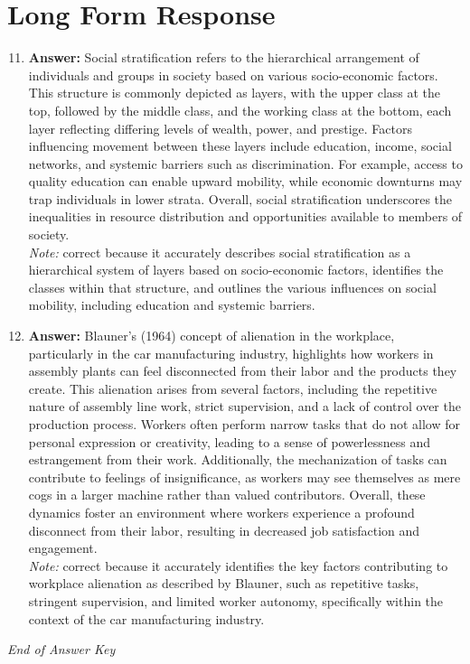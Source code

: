 \documentclass[12pt]{article}
\begin{document}
\section*{Long Form Response}
\begin{enumerate}[label=\arabic*.]
\setcounter{enumi}{10}
\item \textbf{Answer:} Social stratification refers to the hierarchical arrangement of individuals and groups in society based on various socio-economic factors. This structure is commonly depicted as layers, with the upper class at the top, followed by the middle class, and the working class at the bottom, each layer reflecting differing levels of wealth, power, and prestige. Factors influencing movement between these layers include education, income, social networks, and systemic barriers such as discrimination. For example, access to quality education can enable upward mobility, while economic downturns may trap individuals in lower strata. Overall, social stratification underscores the inequalities in resource distribution and opportunities available to members of society.
\\ \textit{Note:} correct because it accurately describes social stratification as a hierarchical system of layers based on socio-economic factors, identifies the classes within that structure, and outlines the various influences on social mobility, including education and systemic barriers.
\item \textbf{Answer:} Blauner's (1964) concept of alienation in the workplace, particularly in the car manufacturing industry, highlights how workers in assembly plants can feel disconnected from their labor and the products they create. This alienation arises from several factors, including the repetitive nature of assembly line work, strict supervision, and a lack of control over the production process. Workers often perform narrow tasks that do not allow for personal expression or creativity, leading to a sense of powerlessness and estrangement from their work. Additionally, the mechanization of tasks can contribute to feelings of insignificance, as workers may see themselves as mere cogs in a larger machine rather than valued contributors. Overall, these dynamics foster an environment where workers experience a profound disconnect from their labor, resulting in decreased job satisfaction and engagement.
\\ \textit{Note:} correct because it accurately identifies the key factors contributing to workplace alienation as described by Blauner, such as repetitive tasks, stringent supervision, and limited worker autonomy, specifically within the context of the car manufacturing industry.
\end{enumerate}

\vfill
\noindent\textit{End of Answer Key}
\end{document}
